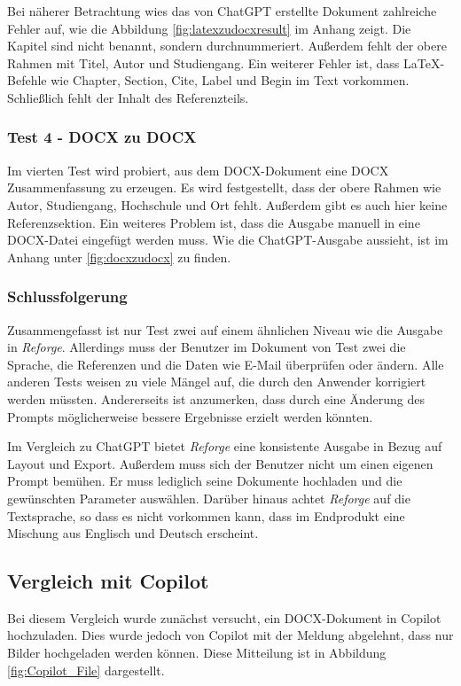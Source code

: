 Bei näherer Betrachtung wies das von Chat\ac{GPT} erstellte Dokument zahlreiche Fehler auf, wie die Abbildung \ref{fig:latexzudocxresult} im Anhang zeigt. Die Kapitel sind nicht benannt, sondern durchnummeriert. Außerdem fehlt der obere Rahmen mit Titel, Autor und Studiengang. Ein weiterer Fehler ist, dass LaTeX-Befehle wie Chapter, Section, Cite, Label und Begin im Text vorkommen. Schließlich fehlt der Inhalt des Referenzteils.  

\subsubsection{Test 4 - \ac{DOCX} zu \ac{DOCX}}

Im vierten Test wird probiert, aus dem \ac{DOCX}-Dokument eine \ac{DOCX} Zusammenfassung zu erzeugen. Es wird festgestellt, dass der obere Rahmen wie Autor, Studiengang, Hochschule und Ort fehlt. Außerdem gibt es auch hier keine Referenzsektion. Ein weiteres Problem ist, dass die Ausgabe manuell in eine \ac{DOCX}-Datei eingefügt werden muss. Wie die Chat\ac{GPT}-Ausgabe aussieht, ist im Anhang unter \ref{fig:docxzudocx} zu finden.

\subsubsection{Schlussfolgerung}

Zusammengefasst ist nur Test zwei auf einem ähnlichen Niveau wie die Ausgabe in \textit{Reforge}. Allerdings muss der Benutzer im Dokument von Test zwei die Sprache, die Referenzen und die Daten wie E-Mail überprüfen oder ändern. Alle anderen Tests weisen zu viele Mängel auf, die durch den Anwender korrigiert werden müssten. Andererseits ist anzumerken, dass durch eine Änderung des Prompts möglicherweise bessere Ergebnisse erzielt werden könnten.

Im Vergleich zu Chat\ac{GPT} bietet \textit{Reforge} eine konsistente Ausgabe in Bezug auf Layout und Export. Außerdem muss sich der Benutzer nicht um einen eigenen Prompt bemühen. Er muss lediglich seine Dokumente hochladen und die gewünschten Parameter auswählen. Darüber hinaus achtet \textit{Reforge} auf die Textsprache, so dass es nicht vorkommen kann, dass im Endprodukt eine Mischung aus Englisch und Deutsch erscheint. 

\subsection{Vergleich mit Copilot}
Bei diesem Vergleich wurde zunächst versucht, ein \ac{DOCX}-Dokument in Copilot hochzuladen. Dies wurde jedoch von Copilot mit der Meldung abgelehnt, dass nur Bilder hochgeladen werden können. Diese Mitteilung ist in Abbildung \ref{fig:Copilot_File} dargestellt.

